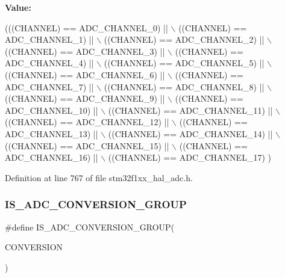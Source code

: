{\bfseries Value\+:}
\begin{DoxyCode}
(((CHANNEL) == ADC\_CHANNEL\_0)           || \(\backslash\)
                                 ((CHANNEL) == ADC\_CHANNEL\_1)           || \(\backslash\)
                                 ((CHANNEL) == ADC\_CHANNEL\_2)           || \(\backslash\)
                                 ((CHANNEL) == ADC\_CHANNEL\_3)           || \(\backslash\)
                                 ((CHANNEL) == ADC\_CHANNEL\_4)           || \(\backslash\)
                                 ((CHANNEL) == ADC\_CHANNEL\_5)           || \(\backslash\)
                                 ((CHANNEL) == ADC\_CHANNEL\_6)           || \(\backslash\)
                                 ((CHANNEL) == ADC\_CHANNEL\_7)           || \(\backslash\)
                                 ((CHANNEL) == ADC\_CHANNEL\_8)           || \(\backslash\)
                                 ((CHANNEL) == ADC\_CHANNEL\_9)           || \(\backslash\)
                                 ((CHANNEL) == ADC\_CHANNEL\_10)          || \(\backslash\)
                                 ((CHANNEL) == ADC\_CHANNEL\_11)          || \(\backslash\)
                                 ((CHANNEL) == ADC\_CHANNEL\_12)          || \(\backslash\)
                                 ((CHANNEL) == ADC\_CHANNEL\_13)          || \(\backslash\)
                                 ((CHANNEL) == ADC\_CHANNEL\_14)          || \(\backslash\)
                                 ((CHANNEL) == ADC\_CHANNEL\_15)          || \(\backslash\)
                                 ((CHANNEL) == ADC\_CHANNEL\_16)          || \(\backslash\)
                                 ((CHANNEL) == ADC\_CHANNEL\_17)            )
\end{DoxyCode}


Definition at line 767 of file stm32f1xx\+\_\+hal\+\_\+adc.\+h.

\mbox{\label{group___a_d_c___private___macros_ga575ea8557edb68b24e8f9a10bb8b1cae}} 
\subsubsection{\texorpdfstring{I\+S\+\_\+\+A\+D\+C\+\_\+\+C\+O\+N\+V\+E\+R\+S\+I\+O\+N\+\_\+\+G\+R\+O\+UP}{IS\_ADC\_CONVERSION\_GROUP}}
{\footnotesize\ttfamily \#define I\+S\+\_\+\+A\+D\+C\+\_\+\+C\+O\+N\+V\+E\+R\+S\+I\+O\+N\+\_\+\+G\+R\+O\+UP(\begin{DoxyParamCaption}\item[{}]{C\+O\+N\+V\+E\+R\+S\+I\+ON }\end{DoxyParamCaption})}

